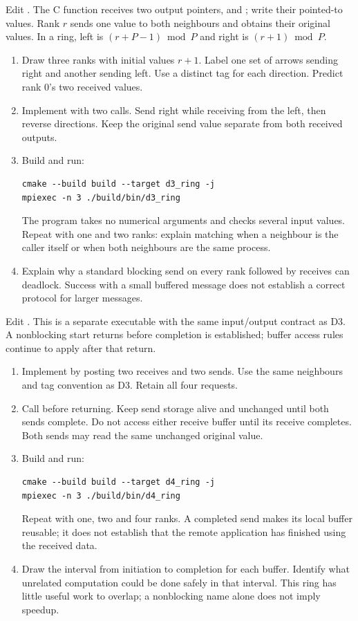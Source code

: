 Edit . The C function receives two output pointers,
 and ; write their pointed-to values. Rank $r$ sends one value to both neighbours
and obtains their original values. In a ring, left is $(r+P-1)\bmod P$ and
right is $(r+1)\bmod P$.
\begin{enumerate}
\item Draw three ranks with initial values $r+1$. Label one set of arrows
sending right and another sending left. Use a distinct tag for each direction.
Predict rank 0's two received values.
\item Implement  with two  calls.
Send right while receiving from the left, then reverse directions. Keep the
original send value separate from both received outputs.
\item Build and run:
\begin{lstlisting}[style=shell]
cmake --build build --target d3_ring -j
mpiexec -n 3 ./build/bin/d3_ring
\end{lstlisting}
The program takes no numerical arguments and checks several input values.
Repeat with one and two ranks: explain matching when a neighbour is the caller
itself or when both neighbours are the same process.
\item Explain why a standard blocking send on every rank followed by receives
can deadlock. Success with a small buffered message does not establish a correct
protocol for larger messages.
\end{enumerate}

Edit . This is a separate executable with the same
input/output contract as D3. A nonblocking start returns before completion is
established; buffer access rules continue to apply after that return.
\begin{enumerate}
\item Implement  by posting two receives and two sends.
Use the same neighbours and tag convention as D3. Retain all four requests.
\item Call  before returning. Keep send storage alive and
unchanged until both sends complete. Do not access either receive buffer until
its receive completes. Both sends may read the same unchanged original value.
\item Build and run:
\begin{lstlisting}[style=shell]
cmake --build build --target d4_ring -j
mpiexec -n 3 ./build/bin/d4_ring
\end{lstlisting}
Repeat with one, two and four ranks. A completed send makes its local buffer
reusable; it does not establish that the remote application has finished using
the received data.
\item Draw the interval from initiation to completion for each buffer. Identify
what unrelated computation could be done safely in that interval. This ring has
little useful work to overlap; a nonblocking name alone does not imply speedup.
\end{enumerate}


